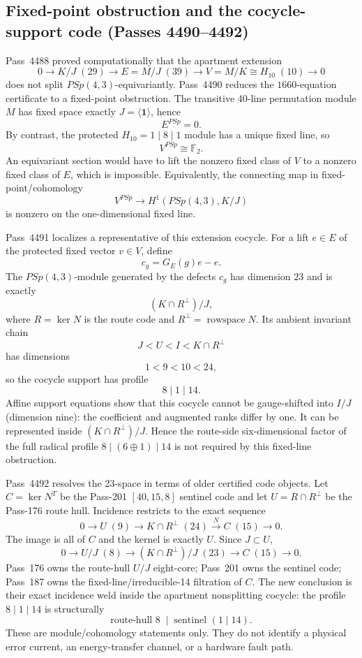 \subsection{Fixed-point obstruction and the cocycle-support code (Passes 4490--4492)}
\label{sec:pass4490-fixed-point-cocycle}

Pass~4488 proved computationally that the apartment extension
\[
 0\to K/J\;(29)\to E=M/J\;(39)\to V=M/K\cong H_{10}\;(10)\to0
\]
does not split $PSp(4,3)$-equivariantly.  Pass~4490 reduces the $1660$-equation
certificate to a fixed-point obstruction.  The transitive 40-line permutation
module $M$ has fixed space exactly $J=\langle\mathbf1\rangle$, hence
\[
 \boxed{E^{PSp}=0.}
\]
By contrast, the protected $H_{10}=1\mid8\mid1$ module has a unique fixed line,
so
\[
 \boxed{V^{PSp}\cong\mathbb F_2.}
\]
An equivariant section would have to lift the nonzero fixed class of $V$ to a
nonzero fixed class of $E$, which is impossible.  Equivalently, the connecting
map in fixed-point/cohomology
\[
 V^{PSp}\longrightarrow H^1(PSp(4,3),K/J)
\]
is nonzero on the one-dimensional fixed line.

Pass~4491 localizes a representative of this extension cocycle.  For a lift
$e\in E$ of the protected fixed vector $v\in V$, define
\[
 c_g=G_E(g)e-e.
\]
The $PSp(4,3)$-module generated by the defects $c_g$ has dimension $23$ and is
exactly
\[
 \boxed{(K\cap R^\perp)/J,}
\]
where $R=\ker N$ is the route code and $R^\perp=\operatorname{rowspace}N$.
Its ambient invariant chain
\[
 J<U<I<K\cap R^\perp
\]
has dimensions
\[
 1<9<10<24,
\]
so the cocycle support has profile
\[
 \boxed{8\mid1\mid14.}
\]
Affine support equations show that this cocycle cannot be gauge-shifted into
$I/J$ (dimension nine): the coefficient and augmented ranks differ by one.
It can be represented inside $(K\cap R^\perp)/J$.  Hence the route-side
six-dimensional factor of the full radical profile $8\mid(6\oplus1)\mid14$
is not required by this fixed-line obstruction.

Pass~4492 resolves the 23-space in terms of older certified code objects.  Let
$C=\ker N^T$ be the Pass-201 $[40,15,8]$ sentinel code and let
$U=R\cap R^\perp$ be the Pass-176 route hull.  Incidence restricts to the exact
sequence
\[
 \boxed{0\to U\;(9)\to K\cap R^\perp\;(24)
 \xrightarrow{\;N\;}C\;(15)\to0.}
\]
The image is all of $C$ and the kernel is exactly $U$.  Since $J\subset U$,
\[
 \boxed{0\to U/J\;(8)\to(K\cap R^\perp)/J\;(23)
 \to C\;(15)\to0.}
\]
Pass~176 owns the route-hull $U/J$ eight-core; Pass~201 owns the sentinel code;
Pass~187 owns the fixed-line/irreducible-14 filtration of $C$.  The new
conclusion is their exact incidence weld inside the apartment nonsplitting
cocycle: the profile $8\mid1\mid14$ is structurally
\[
 \boxed{\text{route-hull }8\;\mid\;\text{sentinel }(1\mid14).}
\]
These are module/cohomology statements only.  They do not identify a physical
error current, an energy-transfer channel, or a hardware fault path.